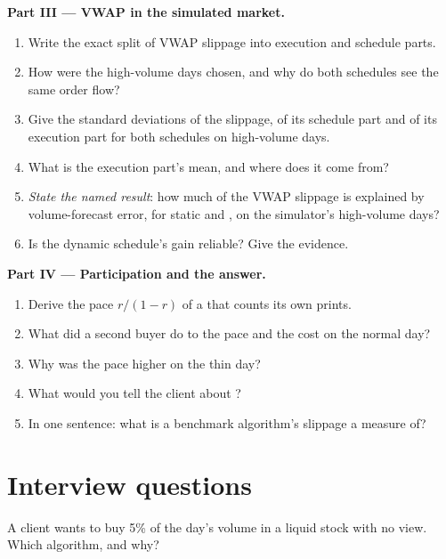 \begin{problem}
\medskip\noindent\textbf{Part III --- VWAP in the simulated market.}
\begin{enumerate}[resume]
\item Write the exact split of VWAP slippage into execution and schedule parts.
\item How were the high-volume days chosen, and why do both schedules see the same order flow?
\item Give the standard deviations of the slippage, of its schedule part and of its execution part for both schedules on high-volume days.
\item What is the execution part's mean, and where does it come from?
\item \emph{State the named result}: how much of the VWAP slippage is explained by volume-forecast error, for static and , on the
simulator's high-volume days?
\item Is the dynamic schedule's gain reliable? Give the evidence.
\end{enumerate}

\medskip\noindent\textbf{Part IV --- Participation and the answer.}
\begin{enumerate}[resume]
\item Derive the pace $r/(1-r)$ of a  that counts its own prints.
\item What did a second buyer do to the pace and the cost on the normal day?
\item Why was the pace higher on the thin day?
\item What would you tell the client about ?
\item In one sentence: what is a benchmark algorithm's slippage a measure of?
\end{enumerate}
\end{problem}

\section{Interview questions}

\begin{interviewq}\label{iq:mx:benchmark-algorithms:1}
A client wants to buy 5\% of the day's volume in a liquid stock with no view. Which algorithm, and why?
\end{interviewq}

